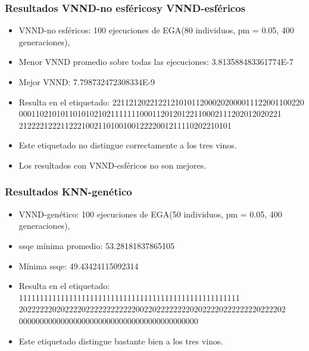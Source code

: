 \documentclass[11pt]{beamer}
\begin{document}
    \begin{frame}
        \frametitle{Resultados VNND-no esféricosy VNND-esféricos}
    \begin{itemize}
        \item VNND-no esféricos: 100 ejecuciones  de EGA(80 individuos, pm = 0.05, 400 generaciones), 
        \item Menor VNND promedio sobre todas las ejecuciones:  3.813588483361774E-7
        \item Mejor VNND: 7.798732472308334E-9
        \item Resulta en el etiquetado: 
       \small{ 2211212022122121010112000202000011122001100220
        000110210101101010210211111110001120120122110002111202012020221
    212222122211222100211010010012222001211110202210101}

        \item Este etiquetado no distingue correctamente a los tres vinos. 
            \pause
        \item Los resultados con VNND-esféricos no son mejores. 
    \end{itemize}
        \end{frame}

        \begin{frame}
        \frametitle{Resultados KNN-genético}
    \begin{itemize}
        \item VNND-genético: 100 ejecuciones  de EGA(50 individuos, pm = 0.05, 400 generaciones), 
        \item ssqe mínima promedio: 53.28181837865105 
        \item Mínima ssqe: 49.43424115092314
        \item Resulta en el etiquetado: 
            \small{11111111111111111111111111111111111111111111111111111
            2022222202022220222222222222002202222222202022220222222220222202
        0000000000000000000000000000000000000000000}

        \item Este etiquetado distingue bastante bien a los tres vinos. 

%        
    \end{itemize}
\end{frame}
\end{document}
